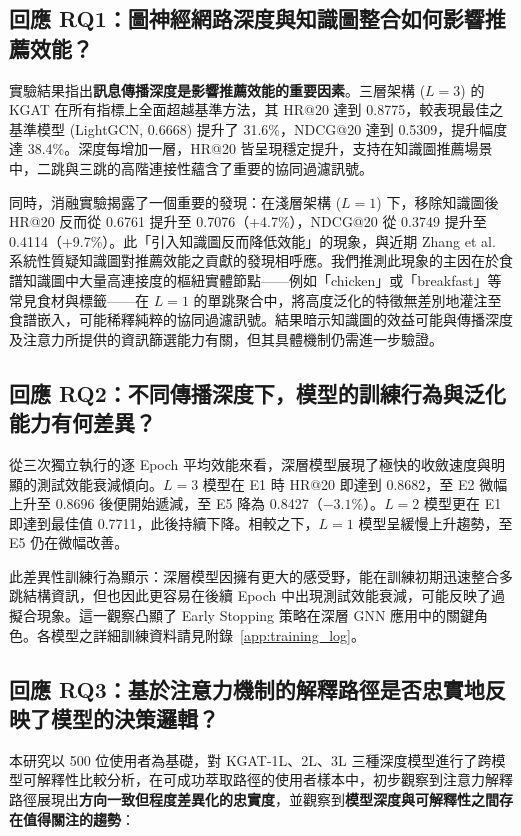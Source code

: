 \subsection*{回應 RQ1：圖神經網路深度與知識圖整合如何影響推薦效能？}

實驗結果指出\textbf{訊息傳播深度是影響推薦效能的重要因素}。三層架構 ($L{=}3$) 的 KGAT 在所有指標上全面超越基準方法，其 HR@20 達到 0.8775，較表現最佳之基準模型 (LightGCN, 0.6668) 提升了 31.6\%，NDCG@20 達到 0.5309，提升幅度達 38.4\%。深度每增加一層，HR@20 皆呈現穩定提升，支持在知識圖推薦場景中，二跳與三跳的高階連接性蘊含了重要的協同過濾訊號。

同時，消融實驗揭露了一個重要的發現：在淺層架構 ($L{=}1$) 下，移除知識圖後 HR@20 反而從 0.6761 提升至 0.7076（+4.7\%），NDCG@20 從 0.3749 提升至 0.4114（+9.7\%）。此「引入知識圖反而降低效能」的現象，與近期 Zhang et al.~\cite{zhang2024kg4receval} 系統性質疑知識圖對推薦效能之貢獻的發現相呼應。我們推測此現象的主因在於食譜知識圖中大量高連接度的樞紐實體節點——例如「chicken」或「breakfast」等常見食材與標籤——在 $L{=}1$ 的單跳聚合中，將高度泛化的特徵無差別地灌注至食譜嵌入，可能稀釋純粹的協同過濾訊號。結果暗示知識圖的效益可能與傳播深度及注意力所提供的資訊篩選能力有關，但其具體機制仍需進一步驗證。

\subsection*{回應 RQ2：不同傳播深度下，模型的訓練行為與泛化能力有何差異？}

從三次獨立執行的逐 Epoch 平均效能來看，深層模型展現了極快的收斂速度與明顯的測試效能衰減傾向。$L{=}3$ 模型在 E1 時 HR@20 即達到 0.8682，至 E2 微幅上升至 0.8696 後便開始遞減，至 E5 降為 0.8427（$-3.1\%$）。$L{=}2$ 模型更在 E1 即達到最佳值 0.7711，此後持續下降。相較之下，$L{=}1$ 模型呈緩慢上升趨勢，至 E5 仍在微幅改善。

此差異性訓練行為顯示：深層模型因擁有更大的感受野，能在訓練初期迅速整合多跳結構資訊，但也因此更容易在後續 Epoch 中出現測試效能衰減，可能反映了過擬合現象。這一觀察凸顯了 Early Stopping 策略在深層 GNN 應用中的關鍵角色。各模型之詳細訓練資料請見附錄~\ref{app:training_log}。

\subsection*{回應 RQ3：基於注意力機制的解釋路徑是否忠實地反映了模型的決策邏輯？}

本研究以 500 位使用者為基礎，對 KGAT-1L、2L、3L 三種深度模型進行了跨模型可解釋性比較分析，在可成功萃取路徑的使用者樣本中，初步觀察到注意力解釋路徑展現出\textbf{方向一致但程度差異化的忠實度}，並觀察到\textbf{模型深度與可解釋性之間存在值得關注的趨勢}：

